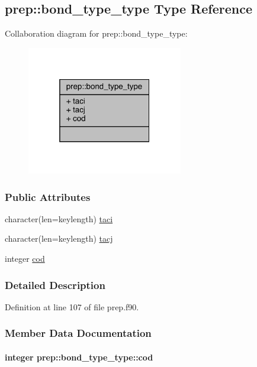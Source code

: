 \hypertarget{structprep_1_1bond__type__type}{\subsection{prep\-:\-:bond\-\_\-type\-\_\-type Type Reference}
\label{structprep_1_1bond__type__type}
}


Collaboration diagram for prep\-:\-:bond\-\_\-type\-\_\-type\-:
\nopagebreak
\begin{figure}[H]
\begin{center}
\leavevmode
\includegraphics[width=193pt]{structprep_1_1bond__type__type__coll__graph}
\end{center}
\end{figure}
\subsubsection*{Public Attributes}
\begin{DoxyCompactItemize}
\item 
character(len=keylength) \hyperlink{structprep_1_1bond__type__type_a75c4d9182bee90121ac0042f83279676}{taci}
\item 
character(len=keylength) \hyperlink{structprep_1_1bond__type__type_ad80305190249c5b39d5ae892a8e55eba}{tacj}
\item 
integer \hyperlink{structprep_1_1bond__type__type_a6d47227ba2aa7deba387e1e41d8155d5}{cod}
\end{DoxyCompactItemize}


\subsubsection{Detailed Description}


Definition at line 107 of file prep.\-f90.



\subsubsection{Member Data Documentation}
\hypertarget{structprep_1_1bond__type__type_a6d47227ba2aa7deba387e1e41d8155d5}{
\paragraph[{cod}]{\setlength{\rightskip}{0pt plus 5cm}integer prep\-::bond\-\_\-type\-\_\-type\-::cod}}\label{structprep_1_1bond__type__type_a6d47227ba2aa7deba387e1e41d8155d5}


